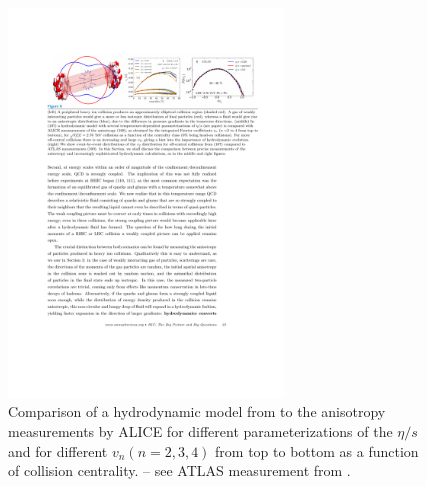\begin{figure}[htbp]
\begin{center}
\includegraphics[width=0.65\textwidth]{figures/theory/flow_coefficients}
\caption{Comparison of a hydrodynamic model from \cite{107} to the anisotropy measurements by ALICE \cite{108} for different parameterizations of the $\eta/s$ and for different $v_n (n = 2, 3, 4)$ from top to bottom as a function of collision centrality.  -- see ATLAS measurement from \cite{109}.}
\label{fig:flow_coeff}
\end{center}
\end{figure}



